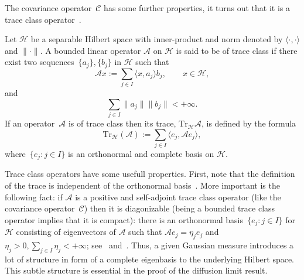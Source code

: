 The covariance operator~$\mathcal{C}$ has some further properties, it turns out that it is a trace class operator~\autocite[Proposition 2.15]{DaPrato1992}.

\begin{defin}\autocite[Section 1.1]{DaPrato2002}
\label{DLR-Setting: Definition trace class}
 Let $\mathcal{H}$ be a separable Hilbert space with inner-product and norm denoted by $\langle \cdot, \cdot \rangle$ and $\| \cdot \|$. A bounded linear operator $\mathcal{A}$ on $\mathcal{H}$ is said to be of trace class if there exist two sequences~$\{ a_j \}, \{ b_j \}$ in $\mathcal{H}$ such that
 \begin{equation*}
  \mathcal{A}x := \sum_{j \in I} \langle x, a_j \rangle b_j, \qquad x \in \mathcal{H},
 \end{equation*}
 and
 \begin{equation*}
  \sum_{j \in I} \| a_j \| \| b_j \| < + \infty.
 \end{equation*}
 If an operator~$\mathcal{A}$ is of trace class then its trace, $\text{Tr}_{\mathcal{H}}\mathcal{A}$, is defined by the formula
 \begin{equation}
  \text{Tr}_{\mathcal{H}}(\mathcal{A}) := \sum_{j \in I} \langle e_j, \mathcal{A} e_j \rangle,
 \end{equation}
 where~$\{ e_j : j \in I \}$  is an orthonormal and complete basis on $\mathcal{H}$.

\end{defin}

Trace class operators have some usefull properties. First, note that the definition of the trace is independent of the orthonormal basis~\autocite[Proposition C.1]{DaPrato1992}. More important is the following fact: if $\mathcal{A}$ is a positive and self-adjoint trace class operator (like the covariance operator~$\mathcal{C}$) then it is diagonizable (being a bounded trace class operator implies that it is compact): there is an orthonormal basis~$\{ e_j : j \in I \}$ for $\mathcal{H}$ consisting of eigenvectors of $\mathcal{A}$ such that $\mathcal{A} e_j = \eta_j e_j $ and $\eta_j > 0, \sum_{j \in I} \eta_j < + \infty$; see~\autocite[Lemma 6.32]{Dashti2014} and~\autocite[Proposition 3.15]{Hairer2009}. Thus, a given Gaussian measure introduces a lot of structure in form of a complete eigenbasis to the underlying Hilbert space. This subtle structure is essential in the proof of the diffusion limit result.


